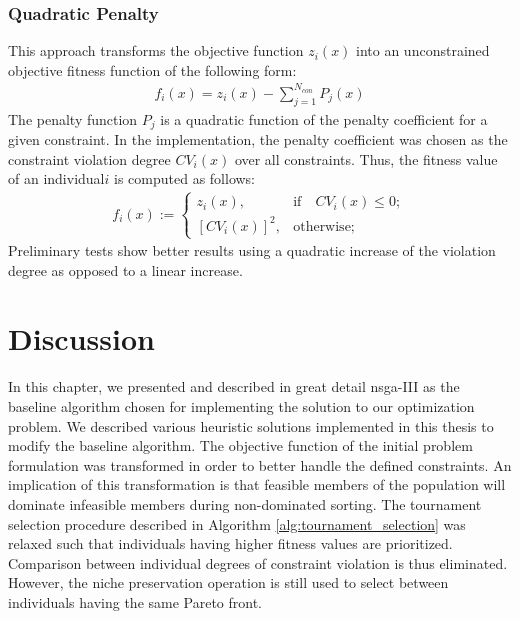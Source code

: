 \subsubsection{Quadratic Penalty}
This approach transforms the objective function $z_i(x)$ into an unconstrained objective fitness function of the following form:
\begin{align*}
    f_i(x) = z_i(x) - \sum_{j=1}^{N_{con}}P_j(x)
\end{align*}
The penalty function $P_j$ is a quadratic function of the penalty coefficient for a given constraint. In the implementation, the penalty coefficient was chosen as the constraint violation degree $CV_i(x)$ over all constraints. Thus, the fitness value of an individual$i$ is computed as follows:
\begin{align*}
    f_{i}(x) := \begin{cases}
                            z_i(x), &\text{if}\quad CV_i(x) \leq 0 ;\\
                            [CV_i(x)]^2, &\text{otherwise};
                             \end{cases}
\end{align*}
Preliminary tests show better results using a quadratic increase of the violation degree as opposed to a linear increase.

\section{Discussion}
In this chapter, we presented and described in great detail \gls{nsga}-III as the baseline algorithm chosen for implementing the solution to our optimization problem. We described various heuristic solutions implemented in this thesis to modify the baseline algorithm. The objective function of the initial problem formulation was transformed in order to better handle the defined constraints. An implication of this transformation is that feasible members of the population will dominate infeasible members during non-dominated sorting. The tournament selection procedure described in Algorithm \ref{alg:tournament_selection} was relaxed such that individuals having higher fitness values are prioritized. Comparison between individual degrees of constraint violation is thus eliminated. However, the niche preservation operation is still used to select between individuals having the same Pareto front.




